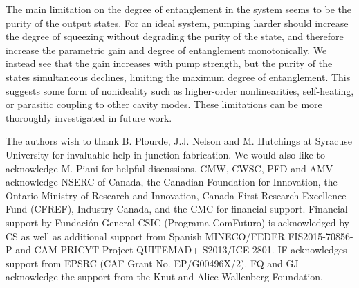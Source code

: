 \documentclass[prl,10pt,twocolumn,superscriptaddress,notitlepage,floatfix,amssymb]{revtex4}
\begin{document}


The main limitation on the degree of entanglement in the system seems to be the purity of the output states.  For an ideal system, pumping harder should increase the degree of squeezing without degrading the purity of the state, and therefore increase the parametric gain and degree of entanglement monotonically.  We instead see that the gain increases with pump strength, but the purity of the states simultaneous declines, limiting the maximum degree of entanglement. This suggests some form of nonideality such as higher-order nonlinearities, self-heating, or parasitic coupling to other cavity modes. These limitations can be more thoroughly investigated in future work.

The authors wish to thank B. Plourde, J.J. Nelson and M. Hutchings at Syracuse University for invaluable help in junction fabrication.  We would also like to acknowledge M. Piani for helpful discussions. CMW, CWSC, PFD and AMV acknowledge NSERC of Canada, the Canadian Foundation for Innovation, the Ontario Ministry of Research and Innovation, Canada First Research Excellence Fund (CFREF), Industry Canada, and the CMC for financial support. Financial support by Fundaci{\'o}n General CSIC (Programa ComFuturo) is acknowledged by CS as well as additional support from Spanish MINECO/FEDER FIS2015-70856-P and CAM PRICYT Project QUITEMAD+ S2013/ICE-2801. IF acknowledges support from EPSRC (CAF Grant No. EP/G00496X/2). FQ and GJ acknowledge the support from the Knut and Alice Wallenberg Foundation.
\end{document}
